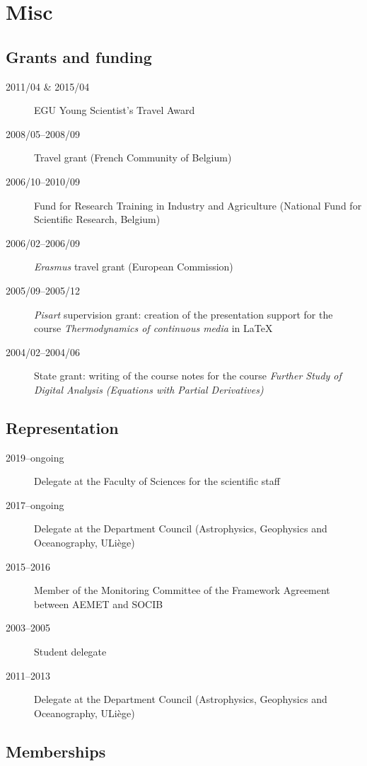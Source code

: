 \documentclass[10pt,a4paper,svgnames]{article}
\begin{document}
\section{Misc}

\subsection{Grants and funding}

\begin{description}
\item[2011/04 \& 2015/04] EGU Young Scientist's Travel Award
\item[2008/05--2008/09] Travel grant (French Community of Belgium)
\item[2006/10--2010/09] Fund for Research Training in Industry and Agriculture (National Fund for Scientific Research, Belgium)
\item[2006/02--2006/09] \textit{Erasmus} travel grant (European Commission)
\item[2005/09--2005/12] \textit{Pisart} supervision grant: creation of the presentation support for the course \textit{Thermodynamics of continuous media} in LaTeX%
\item[2004/02--2004/06] State grant: writing of the course notes for the course \textit{Further Study of Digital Analysis (Equations with Partial Derivatives)}%
\end{description}

\subsection{Representation}
\begin{description}
\item[2019--ongoing] Delegate at the Faculty of Sciences for the scientific staff
\item[2017--ongoing] Delegate at the Department Council (Astrophysics, Geophysics and Oceanography, ULi\`{e}ge)
\item[2015--2016] Member of the Monitoring Committee of the Framework Agreement between AEMET and SOCIB
\item[2003--2005] Student delegate 
\item[2011--2013] Delegate at the Department Council (Astrophysics, Geophysics and Oceanography, ULi\`{e}ge)
\end{description}


\subsection{Memberships}
\end{document}

